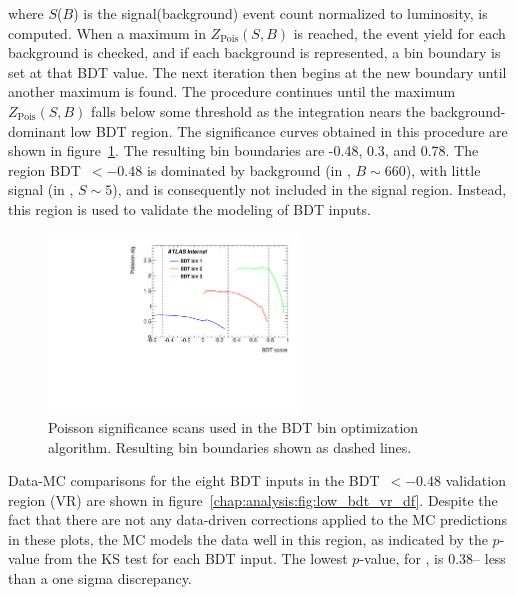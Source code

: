 \noindent
where $S$($B$) is the signal(background) event count normalized to
luminosity, is computed. When a maximum in $Z_{\textrm{Pois}}(S,B)$ is
reached, the event yield for each background is checked, and if each
background is represented, a bin boundary is set at that BDT
value. The next iteration then begins at the new boundary until another
maximum is found. The procedure continues until the maximum
$Z_{\textrm{Pois}}(S,B)$ falls below some threshold as the integration
nears the background-dominant low BDT region. The significance curves
obtained in this procedure are shown in
figure~\ref{chap:analysis:fig:bin_opt}. The resulting bin boundaries
are -0.48, 0.3, and 0.78. The region BDT~$<-0.48$ is dominated by
background (in \emme, $B \sim 660$), with little signal (in \emme, $S \sim 5$),
and is consequently not included in the signal region. Instead, this
region is used to validate the modeling of BDT inputs. 

\begin{figure}[h]
  \centering
  \includegraphics[width=0.6\textwidth]{fig/analysis/bin_opt_plot.pdf}
  \caption{Poisson significance scans used in the BDT bin optimization
  algorithm. Resulting bin boundaries shown as dashed lines.}
  \label{chap:analysis:fig:bin_opt}
\end{figure}

Data-MC comparisons for the eight BDT inputs in the BDT~$<-0.48$
validation region (VR) are shown in
figure~\ref{chap:analysis:fig:low_bdt_vr_df}. Despite the fact that
there are not any data-driven corrections applied to the MC
predictions in these plots, the MC models the data well in this
region, as indicated by the $p$-value from the KS test for each BDT
input. The lowest $p$-value, for \lepEtaCent, is 0.38-- less than a
one sigma discrepancy. 

